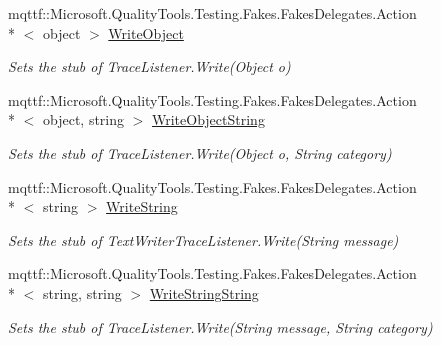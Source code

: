 \begin{DoxyCompactItemize}
mqttf\-::\-Microsoft.\-Quality\-Tools.\-Testing.\-Fakes.\-Fakes\-Delegates.\-Action\\*
$<$ object $>$ \hyperlink{class_system_1_1_diagnostics_1_1_fakes_1_1_stub_text_writer_trace_listener_af73ac3659efc7d0fd8e24b0a8c1c0264}{Write\-Object}
\begin{DoxyCompactList}\small\item\em Sets the stub of Trace\-Listener.\-Write(\-Object o)\end{DoxyCompactList}\item 
mqttf\-::\-Microsoft.\-Quality\-Tools.\-Testing.\-Fakes.\-Fakes\-Delegates.\-Action\\*
$<$ object, string $>$ \hyperlink{class_system_1_1_diagnostics_1_1_fakes_1_1_stub_text_writer_trace_listener_af942eaa96060fd97eb9437a4d9e5d4ec}{Write\-Object\-String}
\begin{DoxyCompactList}\small\item\em Sets the stub of Trace\-Listener.\-Write(\-Object o, String category)\end{DoxyCompactList}\item 
mqttf\-::\-Microsoft.\-Quality\-Tools.\-Testing.\-Fakes.\-Fakes\-Delegates.\-Action\\*
$<$ string $>$ \hyperlink{class_system_1_1_diagnostics_1_1_fakes_1_1_stub_text_writer_trace_listener_aebaa5b564516b9cbb4db49a09d451faa}{Write\-String}
\begin{DoxyCompactList}\small\item\em Sets the stub of Text\-Writer\-Trace\-Listener.\-Write(\-String message)\end{DoxyCompactList}\item 
mqttf\-::\-Microsoft.\-Quality\-Tools.\-Testing.\-Fakes.\-Fakes\-Delegates.\-Action\\*
$<$ string, string $>$ \hyperlink{class_system_1_1_diagnostics_1_1_fakes_1_1_stub_text_writer_trace_listener_aed73d63f12e22e4c4925393649f9fb45}{Write\-String\-String}
\begin{DoxyCompactList}\small\item\em Sets the stub of Trace\-Listener.\-Write(\-String message, String category)\end{DoxyCompactList}\end{DoxyCompactItemize}
